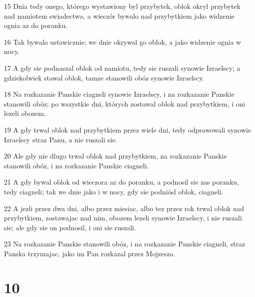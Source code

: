 \par 15 Dnia tedy onego, którego wystawiony byl przybytek, oblok okryl przybytek nad namiotem swiadectwa, a wieczór bywalo nad przybytkiem jako widzenie ognia az do poranku.
\par 16 Tak bywalo ustawicznie; we dnie okrywal go oblok, a jako widzenie ognia w nocy.
\par 17 A gdy sie podnaszal oblok od namiotu, tedy sie ruszali synowie Izraelscy; a gdziekolwiek stawal oblok, tamze stanowili obóz synowie Izraelscy.
\par 18 Na rozkazanie Panskie ciagneli synowie Izraelscy, i na rozkazanie Panskie stanowili obóz; po wszystkie dni, których zostawal oblok nad przybytkiem, i oni lezeli obozem.
\par 19 A gdy trwal oblok nad przybytkiem przez wiele dni, tedy odprawowali synowie Izraelscy straz Panu, a nie ruszali sie.
\par 20 Ale gdy nie dlugo trwal oblok nad przybytkiem, na rozkazanie Panskie stanowili obóz, i na rozkazanie Panskie ciagneli.
\par 21 A gdy bywal oblok od wieczora az do poranku, a podnosil sie zas poranku, tedy ciagneli; tak we dnie jako i w nocy, gdy sie podniósl oblok, ciagneli.
\par 22 A jezli przez dwa dni, albo przez miesiac, albo tez przez rok trwal oblok nad przybytkiem, zostawajac nad nim, obozem lezeli synowie Izraelscy, i nie ruszali sie; ale gdy sie on podnosil, i oni sie ruszali.
\par 23 Na rozkazanie Panskie stanowili obóz, i na rozkazanie Panskie ciagneli, straz Panska trzymajac, jako im Pan rozkazal przez Mojzesza.

\chapter{10}

